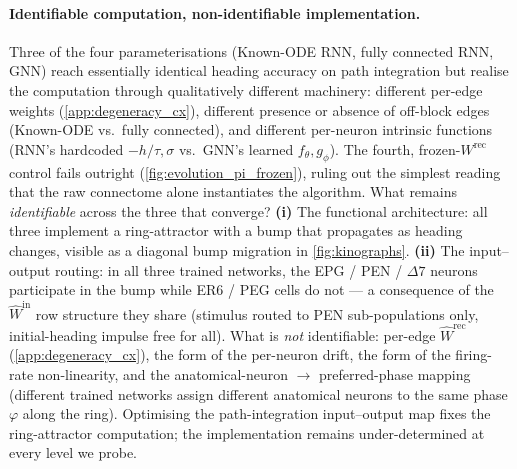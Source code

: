 \documentclass[11pt]{article}
\begin{document}
\paragraph{Identifiable computation, non-identifiable implementation.}
Three of the four parameterisations (Known-ODE RNN, fully connected
RNN, GNN) reach essentially identical heading accuracy on path
integration but realise the computation through qualitatively
different machinery: different per-edge weights
(\cref{app:degeneracy_cx}), different presence or absence of
off-block edges (Known-ODE vs.\ fully connected), and different
per-neuron intrinsic functions (RNN's hardcoded $-h/\tau,\sigma$
vs.\ GNN's learned $f_\theta, g_\phi$). The fourth, frozen-$W^{\mathrm{rec}}$
control fails outright (\cref{fig:evolution_pi_frozen}), ruling out
the simplest reading that the raw connectome alone instantiates the
algorithm. What remains \emph{identifiable} across the three
that converge?
\textbf{(i)} The functional architecture: all three implement a
ring-attractor with a bump that propagates as heading changes,
visible as a diagonal bump migration in \cref{fig:kinographs}.
\textbf{(ii)} The input--output routing: in all three trained
networks, the EPG / PEN / $\Delta 7$ neurons participate in the
bump while ER6 / PEG cells do not --- a consequence of the
$\hat W^{\mathrm{in}}$ row structure they share (stimulus routed
to PEN sub-populations only, initial-heading impulse free for all).
What is \emph{not} identifiable: per-edge $\hat W^{\mathrm{rec}}$
(\cref{app:degeneracy_cx}), the form of the per-neuron drift, the
form of the firing-rate non-linearity, and the anatomical-neuron
$\to$ preferred-phase mapping (different trained networks assign
different anatomical neurons to the same phase $\varphi$ along the
ring). Optimising the path-integration input--output map fixes
the ring-attractor computation; the implementation remains
under-determined at every level we probe.
\end{document}
